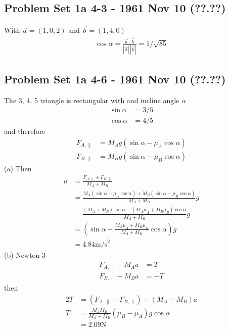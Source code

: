 \documentclass[../main.tex]{subfiles}
\begin{document}
\subsection{Problem Set 1a 4-3 - 1961 Nov 10 (??.??)}
With $\vec{a}=(1,0,2)$ and $\vec{b}=(1,4,0)$
\begin{align}
\cos\alpha=\frac{\vec{a}\cdot\vec{b}}{|\vec{a}|\,|\vec{b}|}
=1/\sqrt{85}
\end{align}

\subsection{Problem Set 1a 4-6 - 1961 Nov 10 (??.??)}
The 3, 4, 5 triangle is rectangular with and incline angle $\alpha$
\begin{align}
\sin\alpha&=3/5\\
\cos\alpha&=4/5
\end{align}
and therefore
\begin{align}
F_{A,\parallel}&=M_Ag(\sin\alpha-\mu_A\cos\alpha)\\
F_{B,\parallel}&=M_Bg(\sin\alpha-\mu_B\cos\alpha)
\end{align}
(a) Then
\begin{align}
a
&=\frac{F_{A,\parallel}+F_{B,\parallel}}{M_A+M_B}\\
&=\frac{M_A(\sin\alpha-\mu_A\cos\alpha)+M_B(\sin\alpha-\mu_B\cos\alpha)}{M_A+M_B}g\\
&=\frac{(M_A+M_B)\sin\alpha-(M_A\mu_A+M_B\mu_B)\cos\alpha}{M_A+M_B}g\\
&=\left(\sin\alpha-\frac{M_A\mu_A+M_B\mu_B}{M_A+M_B}\cos\alpha\right)g\\
&=4.84\text{m/s}^2
\end{align}
(b) Newton 3
\begin{align}
F_{A,\parallel}-M_Aa&=T\\
F_{B,\parallel}-M_Ba&=-T
\end{align}
then
\begin{align}
2T
&=(F_{A,\parallel}-F_{B,\parallel})-(M_A-M_B)a\\
T&=\frac{M_AM_B}{M_A+M_B}(\mu_B-\mu_A)g\cos\alpha\\
&=2.09\text{N}
\end{align}
\end{document}
